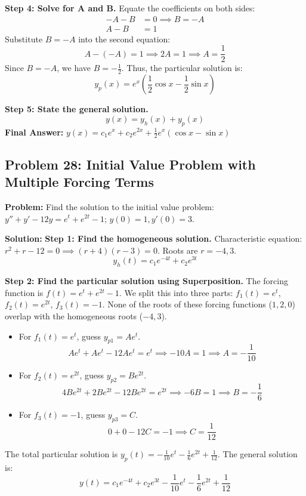 \documentclass[12pt]{article}
\begin{document}
\textbf{Step 4: Solve for A and B.}
Equate the coefficients on both sides:
\begin{align*}
-A - B &= 0 \implies B = -A \\
A - B &= 1
\end{align*}
Substitute $B = -A$ into the second equation:
\[ A - (-A) = 1 \implies 2A = 1 \implies A = \frac{1}{2} \]
Since $B = -A$, we have $B = -\frac{1}{2}$.
Thus, the particular solution is:
\[ y_p(x) = e^x \left( \frac{1}{2} \cos x - \frac{1}{2} \sin x \right) \]

\textbf{Step 5: State the general solution.}
\[ y(x) = y_h(x) + y_p(x) \]
\textbf{Final Answer:} $y(x) = c_1 e^x + c_2 e^{2x} + \frac{1}{2} e^x (\cos x - \sin x)$

\subsection{Problem 28: Initial Value Problem with Multiple Forcing Terms}
\textbf{Problem:} Find the solution to the initial value problem: $y'' + y' - 12y = e^t + e^{2t} - 1$; $y(0) = 1, y'(0) = 3$.

\textbf{Solution:}
\textbf{Step 1: Find the homogeneous solution.}
Characteristic equation: $r^2 + r - 12 = 0 \implies (r + 4)(r - 3) = 0$.
Roots are $r = -4, 3$.
\[ y_h(t) = c_1 e^{-4t} + c_2 e^{3t} \]

\textbf{Step 2: Find the particular solution using Superposition.}
The forcing function is $f(t) = e^t + e^{2t} - 1$. We split this into three parts: $f_1(t) = e^t$, $f_2(t) = e^{2t}$, $f_3(t) = -1$. None of the roots of these forcing functions ($1, 2, 0$) overlap with the homogeneous roots ($-4, 3$).
\begin{itemize}
    \item For $f_1(t) = e^t$, guess $y_{p1} = A e^t$.
    \[ A e^t + A e^t - 12 A e^t = e^t \implies -10A = 1 \implies A = -\frac{1}{10} \]
    \item For $f_2(t) = e^{2t}$, guess $y_{p2} = B e^{2t}$.
    \[ 4B e^{2t} + 2B e^{2t} - 12B e^{2t} = e^{2t} \implies -6B = 1 \implies B = -\frac{1}{6} \]
    \item For $f_3(t) = -1$, guess $y_{p3} = C$.
    \[ 0 + 0 - 12C = -1 \implies C = \frac{1}{12} \]
\end{itemize}
The total particular solution is $y_p(t) = -\frac{1}{10}e^t - \frac{1}{6}e^{2t} + \frac{1}{12}$.
The general solution is:
\[ y(t) = c_1 e^{-4t} + c_2 e^{3t} - \frac{1}{10}e^t - \frac{1}{6}e^{2t} + \frac{1}{12} \]
\end{document}
